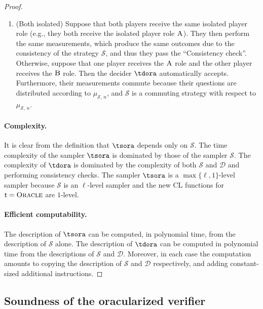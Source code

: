 \documentclass[11pt]{article}
\theoremstyle{definition}
\newcommand{\sampler}{\mathcal{S}}
\newcommand{\decider}{\mathcal{D}}
\newcommand{\strategy}{\mathscr{S}}
\newcommand{\labelstyle}[1]{\ensuremath{\textsc{#1}}\xspace}
\newcommand{\tvarstyle}[1]{\mathsf{#1}}
\newcommand{\tvar}{\ensuremath{\tvarstyle{t}}}
\newcommand{\alice}{\labelstyle{A}}
\newcommand{\bob}{\labelstyle{B}}
\newcommand{\oracle}{\labelstyle{Oracle}}
\begin{document}
\begin{proof}
\begin{enumerate}
  \item ({Both isolated}) Suppose that both players receive the same isolated
    player role (e.g., they both receive the isolated player role $\alice$).
    They then perform the same measurements, which produce the same outcomes due
    to the consistency of the strategy $\strategy$, and thus they pass the
    ``Consistency check''.
    Otherwise, suppose that one player receives the $\alice$ role and the other
    player receives the $\bob$ role.
    Then the decider $\tdora$ automatically accepts.
    Furthermore, their measurements commute because their questions are
    distributed according to $\mu_{\sampler,\, n}$, and $\strategy$ is a
    commuting strategy with respect to $\mu_{\sampler,\, n}$.
  \end{enumerate}

  \paragraph{Complexity.}
  It is clear from the definition that $\tsora$ depends only on
  $\sampler$.
  The time complexity of the sampler $\tsora$ is dominated by those of
  the sampler $\sampler$.
  The complexity of $\tdora$ is dominated by the complexity of both $\sampler$ and $\decider$
  and performing consistency checks.
  The sampler $\tsora$ is a $\max\{\ell,1\}$-level sampler because
  $\sampler$ is an $\ell$-level sampler and the new CL functions for
  $\tvar=\oracle$ are $1$-level.

  \paragraph{Efficient computability.}
  The description of $\tsora$ can be computed, in polynomial time, from
  the description of $\sampler$ alone.
  The description of $\tdora$ can be computed in polynomial time from the
  descriptions of $\sampler$ and $\decider$.
  Moreover, in each case the computation amounts to copying the description of
  $\sampler$ and $\decider$ respectively, and adding constant-sized additional
  instructions.

\end{proof}

\subsection{Soundness of the oracularized verifier}
\end{document}
